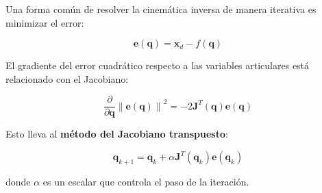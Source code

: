 Una forma común de resolver la cinemática inversa de manera iterativa es minimizar el error:

\[
\boldsymbol{e}(\boldsymbol{q}) = \boldsymbol{x}_d - f(\boldsymbol{q})
\]

El gradiente del error cuadrático respecto a las variables articulares está relacionado con el Jacobiano:

\[
\frac{\partial}{\partial \boldsymbol{q}} \left\| \boldsymbol{e}(\boldsymbol{q}) \right\|^2 = -2 \mathbf{J}^T(\boldsymbol{q}) \boldsymbol{e}(\boldsymbol{q})
\]

Esto lleva al \textbf{método del Jacobiano transpuesto}:

\[
\boldsymbol{q}_{k+1} = \boldsymbol{q}_k + \alpha \mathbf{J}^T(\boldsymbol{q}_k) \boldsymbol{e}(\boldsymbol{q}_k)
\]

donde $\alpha$ es un escalar que controla el paso de la iteración.


